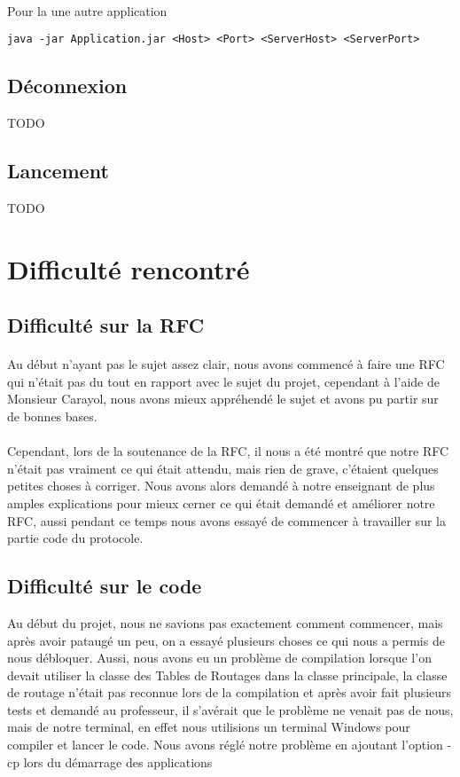 \documentclass[a4paper,titlepage]{report}
\begin{document}
\paragraph{}
Pour la une autre application
\begin{lstlisting}
java -jar Application.jar <Host> <Port> <ServerHost> <ServerPort>
\end{lstlisting}
\subsection{Déconnexion}
TODO
\subsection{Lancement}
TODO
\section{Difficulté rencontré}
\subsection{Difficulté sur la RFC}
\paragraph{}
Au début n'ayant pas le sujet assez clair, nous avons commencé à faire une RFC qui n'était pas du tout en rapport avec le sujet du projet, cependant à l'aide de Monsieur Carayol, nous avons mieux appréhendé le sujet et avons pu partir sur de bonnes bases.
\paragraph{}
Cependant, lors de la soutenance de la RFC, il nous a été montré que notre RFC n'était pas vraiment ce qui était attendu, mais rien de grave, c'étaient quelques petites choses à corriger.
Nous avons alors demandé à notre enseignant de plus amples explications pour mieux cerner ce qui était demandé et améliorer notre RFC, aussi pendant ce temps nous avons essayé de commencer à travailler sur la partie code du protocole.
\subsection{Difficulté sur le code}
Au début du projet, nous ne savions pas exactement comment commencer, mais après avoir pataugé un peu, on a essayé plusieurs choses ce qui nous a permis  de nous débloquer.
Aussi, nous avons eu un problème de compilation lorsque l'on devait utiliser la classe des Tables de Routages dans la classe principale, la classe de routage n'était pas reconnue lors de la compilation et après avoir fait plusieurs tests et demandé au professeur, il s'avérait que le problème ne venait pas de nous, mais de notre terminal, en effet nous utilisions un terminal Windows pour compiler et lancer le code.
Nous avons réglé notre problème en ajoutant l'option -cp lors du démarrage des applications
\end{document}
